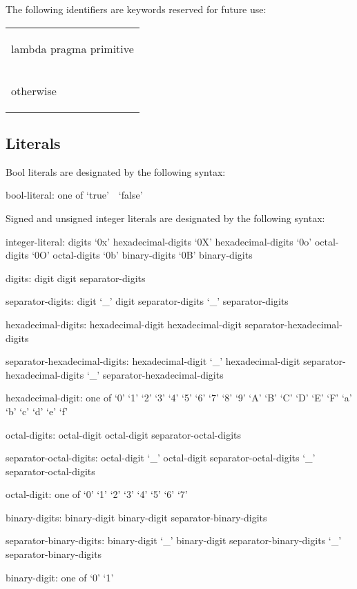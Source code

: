 The following identifiers are keywords reserved for future use:

\begin{tabular}{l}
\begin{chapel}
lambda
pragma
primitive
\end{chapel} \\
\begin{invisible}
otherwise
\end{invisible}
\end{tabular}

\subsection{Literals}
\label{Literals}
\label{Primitive_Type_Literals}

Bool literals are designated by the following syntax:
\begin{syntax}
bool-literal: one of
  `true' $ $ $ $ `false'
\end{syntax}

Signed and unsigned integer literals are designated by the following
syntax:
\begin{syntax}
integer-literal:
  digits
  `0x' hexadecimal-digits
  `0X' hexadecimal-digits
  `0o' octal-digits
  `0O' octal-digits
  `0b' binary-digits
  `0B' binary-digits

digits:
  digit
  digit separator-digits

separator-digits:
  digit
  `_'
  digit separator-digits
  `_' separator-digits

hexadecimal-digits:
  hexadecimal-digit
  hexadecimal-digit separator-hexadecimal-digits

separator-hexadecimal-digits:
  hexadecimal-digit
  `_'
  hexadecimal-digit separator-hexadecimal-digits
  `_' separator-hexadecimal-digits

hexadecimal-digit: one of
  `0' `1' `2' `3' `4' `5' `6' `7' `8' `9' `A' `B' `C' `D' `E' `F' `a' `b' `c' `d' `e' `f'

octal-digits:
  octal-digit
  octal-digit separator-octal-digits

separator-octal-digits:
  octal-digit
  `_'
  octal-digit separator-octal-digits
  `_' separator-octal-digits

octal-digit: one of
  `0' `1' `2' `3' `4' `5' `6' `7'

binary-digits:
  binary-digit
  binary-digit separator-binary-digits

separator-binary-digits:
  binary-digit
  `_'
  binary-digit separator-binary-digits
  `_' separator-binary-digits

binary-digit: one of
  `0' `1'
\end{syntax}

